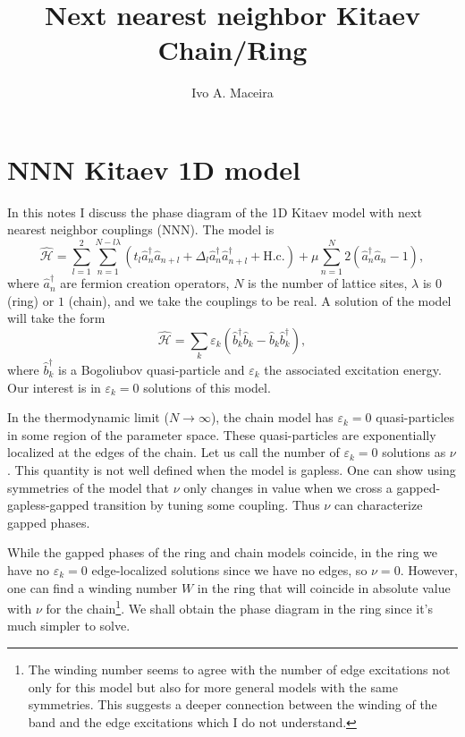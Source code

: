 \documentclass[a4paper]{article}
\title{Next nearest neighbor Kitaev Chain/Ring}
\author{Ivo A. Maceira}
\newcommand{\en}{\varepsilon}
\newcommand{\Ha}{\hat{\mathcal{H}}}
\newcommand{\C}{\hat{a}^{\dagger}}
\newcommand{\D}{\hat{a}}
\newcommand{\Cb}{\hat{b}^{\dagger}}
\newcommand{\Db}{\hat{b}}
\begin{document}
\maketitle
\pagebreak

\section{NNN Kitaev 1D model}
\label{sec:nnn_kitaev_1d_model}
In this notes I discuss the phase diagram of the 1D Kitaev model with next nearest neighbor couplings (NNN). The model is
\begin{equation}
	\Ha = \sum_{l=1}^{2}\sum_{n=1}^{N-l\lambda}( t_l\C_{n}\D_{n+l} + \Delta_l\C_{n}\C_{n+l} + \textrm{H.c.}) + \mu\sum_{n=1}^{N} 2(\C_{n}\D_{n} - 1),
\end{equation}
where $\C_n$ are fermion creation operators, $N$ is the number of lattice sites, $\lambda$ is $0$ (ring) or $1$ (chain), and we take the couplings to be real. A solution of the model will take the form
\begin{equation}
	\Ha = \sum_{k} \en_k (\Cb_k \Db_k - \Db_k \Cb_k),
	\label{eq:H_bogoliubov}
\end{equation}
where $\Cb_k$ is a Bogoliubov quasi-particle and $\en_k$ the associated excitation energy. Our interest is in $\en_k = 0$ solutions of this model.

In the thermodynamic limit ($N \rightarrow \infty$), the chain model has $\en_k = 0$ quasi-particles in some region of the parameter space. These quasi-particles are exponentially localized at the edges of the chain. Let us call the number of $\en_k = 0$ solutions as $\nu$. This quantity is not well defined when the model is gapless. One can show using symmetries of the model that $\nu$ only changes in value when we cross a gapped-gapless-gapped transition by tuning some coupling. Thus $\nu$ can characterize gapped phases.

While the gapped phases of the ring and chain models coincide, in the ring we have no $\en_k = 0$ edge-localized solutions since we have no edges, so $\nu = 0$. However, one can find a winding number $W$ in the ring that will coincide in absolute value with $\nu$ for the chain\footnote{The winding number seems to agree with the number of edge excitations not only for this model but also for more general models with the same symmetries. This suggests a deeper connection between the winding of the band and the edge excitations which I do not understand.}. We shall obtain the phase diagram in the ring since it's much simpler to solve.
\end{document}
